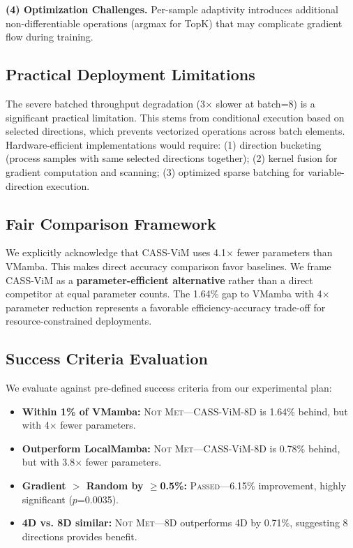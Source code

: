 \documentclass{article}
\begin{document}
\textbf{(4) Optimization Challenges.} Per-sample adaptivity introduces additional non-differentiable operations (argmax for TopK) that may complicate gradient flow during training.

\subsection{Practical Deployment Limitations}

The severe batched throughput degradation (3$\times$ slower at batch=8) is a significant practical limitation. This stems from conditional execution based on selected directions, which prevents vectorized operations across batch elements. Hardware-efficient implementations would require: (1) direction bucketing (process samples with same selected directions together); (2) kernel fusion for gradient computation and scanning; (3) optimized sparse batching for variable-direction execution.

\subsection{Fair Comparison Framework}

We explicitly acknowledge that CASS-ViM uses 4.1$\times$ fewer parameters than VMamba. This makes direct accuracy comparison favor baselines. We frame CASS-ViM as a \textbf{parameter-efficient alternative} rather than a direct competitor at equal parameter counts. The 1.64\% gap to VMamba with 4$\times$ parameter reduction represents a favorable efficiency-accuracy trade-off for resource-constrained deployments.

\subsection{Success Criteria Evaluation}

We evaluate against pre-defined success criteria from our experimental plan:

\begin{itemize}
    \item \textbf{Within 1\% of VMamba:} \textsc{Not Met}---CASS-ViM-8D is 1.64\% behind, but with 4$\times$ fewer parameters.
    \item \textbf{Outperform LocalMamba:} \textsc{Not Met}---CASS-ViM-8D is 0.78\% behind, but with 3.8$\times$ fewer parameters.
    \item \textbf{Gradient $>$ Random by $\geq$0.5\%:} \textsc{Passed}---6.15\% improvement, highly significant ($p$=0.0035).
    \item \textbf{4D vs. 8D similar:} \textsc{Not Met}---8D outperforms 4D by 0.71\%, suggesting 8 directions provides benefit.
\end{itemize}
\end{document}
